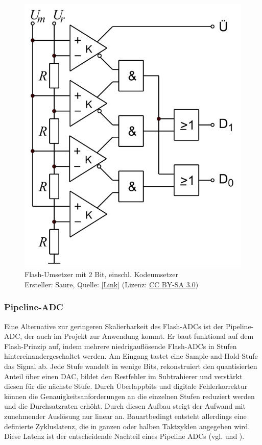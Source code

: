 \documentclass[a4paper, portrait, 12pt]{scrartcl} %
\begin{document}
\begin{figure}[H]
	\centering
		\includegraphics[scale=0.3]{DMT_ADU-2-Bit-Flash.png} 
		\caption{\centering  Flash-Umsetzer mit 2 Bit, einschl. Kodeumsetzer\\
		\footnotesize Ersteller: Saure, Quelle: \href{https://de.wikipedia.org/wiki/Datei:DMT_ADU-2-Bit-Flash.svg}{[Link]} (Lizenz: \href{https://creativecommons.org/licenses/by-sa/3.0/}{CC BY-SA 3.0})
		}
	\label{fig:2bit_flash_adc}
\end{figure}

\subsubsection{Pipeline-ADC}
Eine Alternative zur geringeren Skalierbarkeit des Flash-ADCs ist der Pipeline-ADC, der auch im Projekt zur Anwendung kommt. Er baut funktional auf dem Flash-Prinzip auf, indem mehrere niedrigauflösende Flash-ADCs in Stufen hintereinandergeschaltet werden. Am Eingang tastet eine Sample-and-Hold-Stufe das Signal ab. Jede Stufe wandelt in wenige Bits, rekonstruiert den quantisierten Anteil über einen DAC, bildet den Restfehler im Subtrahierer und verstärkt diesen für die nächste Stufe. Durch Überlappbits und digitale Fehlerkorrektur können die Genauigkeitsanforderungen an die einzelnen Stufen reduziert werden und die Durchsatzraten erhöht. Durch diesen Aufbau steigt der Aufwand mit zunehmender Auslösung nur linear an. Bauartbedingt entsteht allerdings eine definierte Zykluslatenz, die in ganzen oder halben Taktzyklen angegeben wird. Diese Latenz ist der entscheidende Nachteil eines Pipeline ADCs (vgl. \cite{MPS} und \cite{AnalogDevices2001c}).
\end{document}
